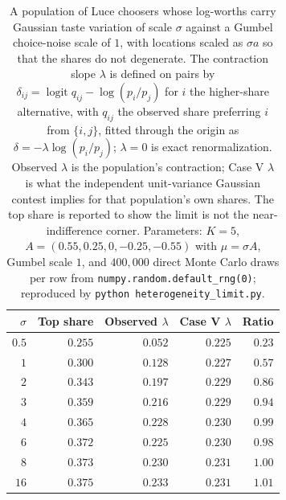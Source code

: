 \documentclass[11pt]{article}
\begin{document}
\begin{table}[ht]
\centering
\small
\begin{tabular}{rrrrr}
\toprule
$\sigma$ & Top share & Observed $\lambda$ & Case V $\lambda$ & Ratio \\
\midrule
$0.5$ & $0.255$ & $0.052$ & $0.225$ & $0.23$ \\
$1$ & $0.300$ & $0.128$ & $0.227$ & $0.57$ \\
$2$ & $0.343$ & $0.197$ & $0.229$ & $0.86$ \\
$3$ & $0.359$ & $0.216$ & $0.229$ & $0.94$ \\
$4$ & $0.365$ & $0.228$ & $0.230$ & $0.99$ \\
$6$ & $0.372$ & $0.225$ & $0.230$ & $0.98$ \\
$8$ & $0.373$ & $0.230$ & $0.231$ & $1.00$ \\
$16$ & $0.375$ & $0.233$ & $0.231$ & $1.01$ \\
\bottomrule
\end{tabular}
\caption{A population of Luce choosers whose log-worths carry Gaussian taste variation of
scale $\sigma$ against a Gumbel choice-noise scale of $1$, with locations scaled as
$\sigma a$ so that the shares do not degenerate. The contraction slope $\lambda$ is defined on
pairs by $\delta_{ij} = \operatorname{logit} q_{ij} - \log(p_i/p_j)$ for $i$ the
higher-share alternative, with $q_{ij}$ the observed share preferring $i$ from
$\{i,j\}$, fitted through the origin as $\delta = -\lambda \log(p_i/p_j)$; $\lambda = 0$ is
exact renormalization. Observed $\lambda$ is the population's
contraction; Case V $\lambda$ is what the independent unit-variance Gaussian contest implies
for that population's own shares. The top share is reported to show the limit is not the
near-indifference corner. Parameters: $K = 5$, $A = (0.55, 0.25, 0, -0.25, -0.55)$ with
$\mu = \sigma A$, Gumbel scale $1$, and $400{,}000$ direct Monte Carlo draws per row from
\texttt{numpy.random.default\_rng(0)}; reproduced by
\texttt{python heterogeneity\_limit.py}.}
\label{tab:mixture}
\end{table}
\end{document}
